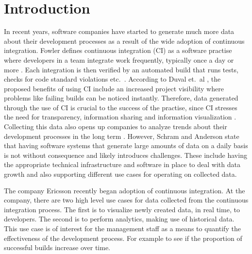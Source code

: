 \chapter{Introduction}

In recent years, software companies have started to generate much more data about their development processes as a result of the wide adoption of continuous integration. Fowler \cite{FowlerCI} defines continuous integration (CI) as a software practise where developers in a team integrate work frequently, typically once a day or more \cite{FowlerCI}. Each integration is then verified by an automated build that runs tests, checks for code standard violations etc.\ \cite{FowlerCI}. According to Duval et.\ al \cite{CIbook}, the proposed benefits of using CI include an increased project visibility where problems like failing builds can be noticed instantly. Therefore, data generated through the use of CI is crucial to the success of the practise, since CI stresses the need for transparency, information sharing and information visualization \cite{FowlerCI, CIbook}. Collecting this data also opens up companies to analyze trends about their development processes in the long term \cite{bigDataMane, CIbook}. However, Schram and Anderson \cite{MySQLToNoSQL} state that having software systems that generate large amounts of data on a daily basis is not without consequence and likely introduces challenges. These include having the appropriate technical infrastructure and software in place to deal with data growth and also supporting different use cases for operating on collected data.  

The company Ericsson recently began adoption of continuous integration. At the company, there are two high level use cases for data collected from the continuous integration process. The first is to visualize newly created data, in real time, to developers. The second is to perform analytics, making use of historical data. This use case is of interest for the management staff as a means to quantify the effectiveness of the development process. For example to see if the proportion of successful builds increase over time.




